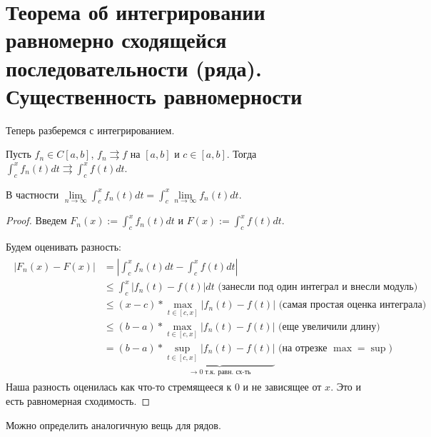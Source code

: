 \section{Теорема об интегрировании равномерно сходящейся последовательности (ряда). Существенность равномерности}
Теперь разберемся с интегрированием.

\begin{theorem}
    Пусть $f_n \in C[a, b]$, $f_n \rightrightarrows f$ на $[a, b]$ и $c \in [a, b]$. 
    Тогда $\int_c^x f_n(t)dt \rightrightarrows \int_c^x f(t)dt$.

    В частности $\lim\limits_{n \to \infty} \int_c^x f_n(t)dt = \int_c^x \lim\limits_{n \to \infty} f_n(t)dt$.
\end{theorem}

\begin{proof}
    Введем $F_n(x) := \int_c^x f_n(t)dt$ и $F(x) := \int_c^x f(t)dt $. 
    
    \quad Будем оценивать разность:
    \begin{gather*}
        \begin{split}
            |F_n(x) - F(x)| &= \left|\int_c^x f_n(t)dt - \int_c^x f(t)dt \right| \\
            &\leqslant \int_c^x |f_n(t) - f(t)|dt \text{ (занесли под один интеграл и внесли модуль) } \\
            &\leqslant (x - c) * \max_{t \in [c, x]} |f_n(t) - f(t)| \text{ (самая простая оценка интеграла) } \\
            &\leqslant (b - a) * \max_{t \in [c, x]} |f_n(t) - f(t)| \text{ (еще увеличили длину) }\\
            &= (b - a) * \underbrace{\sup_{t \in [c, x]} |f_n(t) - f(t)|}_{\to 0 \text{ т.к. равн. сх-ть}} \text{ (на отрезке $\max = \sup$) }
        \end{split}
    \end{gather*}
    Наша разность оценилась как что-то стремящееся к 0 и не зависящее от $x$. Это и есть равномерная сходимость.
\end{proof}

\vspace*{7mm}

Можно определить аналогичную вещь для рядов.

